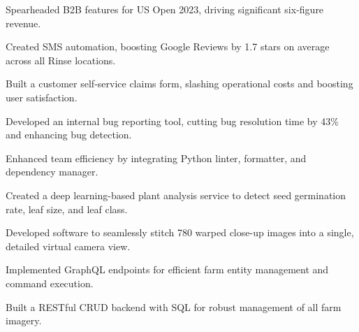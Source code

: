 \documentclass[]{deedy-resume-openfont}
\begin{document}
\vspace{-4pt}
\begin{tightemize}%
\item Spearheaded B2B features for US Open 2023, driving significant six-figure revenue.
\item Created SMS automation, boosting Google Reviews by 1.7 stars on average across all Rinse locations.
\item Built a customer self-service claims form, slashing operational costs and boosting user satisfaction.
\item Developed an internal bug reporting tool, cutting bug resolution time by 43\% and enhancing bug detection.
\item Enhanced team efficiency by integrating Python linter, formatter, and dependency manager.


\end{tightemize}
\sectionsep


{}
\hfill{}

\vspace{-4pt}
\begin{tightemize}%


\item Created a deep learning-based plant analysis service to detect seed germination rate, leaf size, and leaf class.
\item Developed software to seamlessly stitch 780 warped close-up images into a single, detailed virtual camera view.
\item Implemented GraphQL endpoints for efficient farm entity management and command execution.
\item Built a RESTful CRUD backend with SQL for robust management of all farm imagery.

\end{tightemize}
\sectionsep
\end{document}
